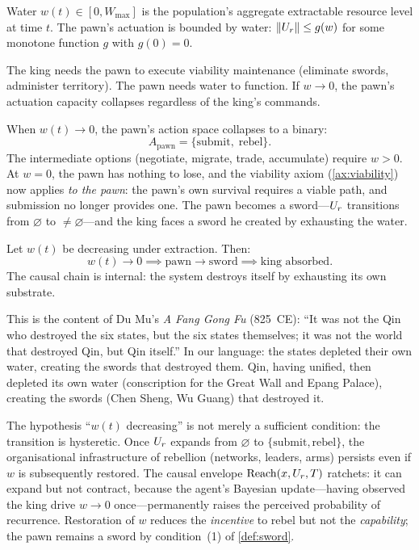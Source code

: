 \begin{definition}[Water]\label{def:water}
Water $w(t) \in [0, W_{\max}]$ is the population's aggregate extractable
resource level at time $t$. The pawn's actuation is bounded by water:
$\|U_r\| \leq g(w)$ for some monotone function $g$ with $g(0) = 0$.
\end{definition}

The king needs the pawn to execute viability maintenance (eliminate
swords, administer territory). The pawn needs water to function. If
$w \to 0$, the pawn's actuation capacity collapses regardless of the
king's commands.

\begin{proposition}[Binary action space at $w = 0$]\label{prop:binary}
When $w(t) \to 0$, the pawn's action space collapses to a binary:
\[
  A_{\text{pawn}} = \{\text{submit},\; \text{rebel}\}.
\]
The intermediate options (negotiate, migrate, trade, accumulate) require
$w > 0$. At $w = 0$, the pawn has nothing to lose, and the viability
axiom (\cref{ax:viability}) now applies \emph{to the pawn}: the pawn's
own survival requires a viable path, and submission no longer provides
one. The pawn becomes a sword---$U_r$ transitions from $\varnothing$ to
$\neq \varnothing$---and the king faces a sword he created by exhausting
the water.
\end{proposition}

\begin{theorem}[Du Mu's theorem]\label{thm:dumu}
Let $w(t)$ be decreasing under extraction. Then:
\[
  w(t) \to 0
  \implies
  \text{pawn} \to \text{sword}
  \implies
  \text{king absorbed.}
\]
The causal chain is internal: the system destroys itself by exhausting
its own substrate.
\end{theorem}

This is the content of Du Mu's \emph{A Fang Gong Fu} \cite{dumu} (825~CE): ``It was
not the Qin who destroyed the six states, but the six states themselves;
it was not the world that destroyed Qin, but Qin itself.'' In our
language: the states depleted their own water, creating the swords that
destroyed them. Qin, having unified, then depleted its own water
(conscription for the Great Wall and Epang Palace), creating the swords
(Chen Sheng, Wu Guang) that destroyed it.

\begin{remark}
\label{rem:dumu-irreversibility}
The hypothesis ``$w(t)$ decreasing'' is not merely a sufficient
condition: the transition is hysteretic.  Once $U_r$ expands from
$\varnothing$ to $\{\text{submit}, \text{rebel}\}$, the organisational
infrastructure of rebellion (networks, leaders, arms) persists even
if $w$ is subsequently restored.  The causal envelope
$\mathrm{Reach}(x, U_r, T)$ ratchets: it can expand but not contract,
because the agent's Bayesian update---having observed the king drive
$w \to 0$ once---permanently raises the perceived probability of
recurrence.  Restoration of $w$ reduces the \emph{incentive} to
rebel but not the \emph{capability}; the pawn remains a sword by
condition~(1) of \cref{def:sword}.
\end{remark}


